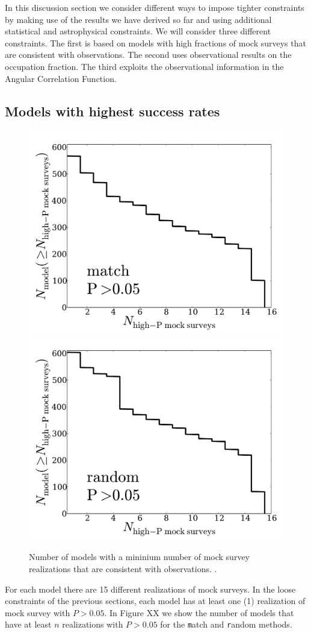 \documentclass[usenatbib]{mn2e}
\begin{document}
In this discussion section we consider different ways to impose tighter
constraints by making use of the results we have derived so far and
using additional statistical and astrophysical constraints. We will
consider three different constraints. The first is based on
models with high fractions of mock surveys that are consistent with
observations. The second uses observational results on the occupation
fraction. The third exploits the observational information in the Angular
Correlation Function.

\subsection{Models with highest success rates}
\begin{figure}
\begin{center}
\includegraphics[width=0.46\linewidth,angle=0]{./plots/Fig4_match_P5.pdf}
\hspace{5mm}
\includegraphics[width=0.46\linewidth,angle=0]{./plots/Fig4_random_P5.pdf}
\end{center} 
\caption{ Number of models with a mininium number of mock survey
  realizations that are consistent with observations.
  \label{figure:high_success_rate}.}  
\end{figure}


For each model there are 15 different realizations of mock surveys. In
the loose constraints of the previous sections, each model has at
least one (1) realization of mock survey with $P>0.05$. In Figure XX
we show the number of models that have at least $n$ realizations with
$P>0.05$ for the {\texttt match} and {\texttt random} methods. 
\end{document}
